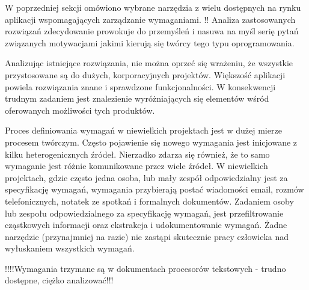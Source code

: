       W poprzedniej sekcji omówiono wybrane narzędzia z wielu dostępnych na rynku aplikacji wspomagających zarządzanie wymaganiami. !! Analiza zastosowanych rozwiązań zdecydowanie prowokuje do przemyśleń i nasuwa na myśl serię pytań związanych motywacjami jakimi kierują się twórcy tego typu oprogramowania. 

      Analizując istniejące rozwiązania, nie można oprzeć się wrażeniu, że wszystkie przystosowane są do dużych, korporacyjnych projektów. Większość aplikacji powiela rozwiązania znane i sprawdzone funkcjonalności. W konsekwencji trudnym zadaniem jest znalezienie wyróżniających się elementów wśród oferowanych możliwości tych produktów. 

      Proces definiowania wymagań w niewielkich projektach jest w dużej mierze procesem twórczym. Często pojawienie się nowego wymagania jest inicjowane z kilku heterogenicznych źródeł. Nierzadko zdarza się również, że to samo wymaganie jest różnie komunikowane przez wiele źródeł. W niewielkich projektach, gdzie często jedna osoba, lub mały zespół odpowiedzialny jest za specyfikację wymagań, wymagania przybierają postać wiadomości email, rozmów telefonicznych, notatek ze spotkań i formalnych dokumentów. Zadaniem osoby lub zespołu odpowiedzialnego za specyfikację wymagań, jest przefiltrowanie cząstkowych informacji oraz ekstrakcja i udokumentowanie wymagań. Żadne narzędzie (przynajmniej na razie) nie zastąpi skutecznie pracy człowieka nad wyłuskaniem wszystkich wymagań. 

      !!!!Wymagania trzymane są w dokumentach procesorów tekstowych - trudno dostępne, ciężko analizować!!!
